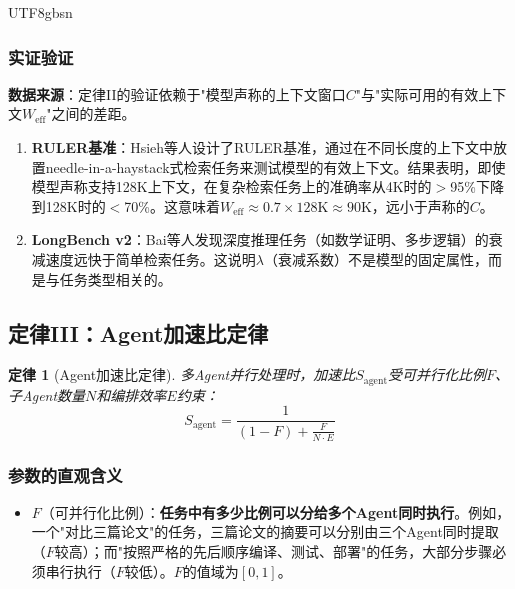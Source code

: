 \documentclass[11pt,a4paper]{article}
\newtheorem{law}{定律}[section]
\begin{document}
\begin{CJK*}{UTF8}{gbsn}
\subsubsection{实证验证}

\textbf{数据来源}：定律II的验证依赖于"模型声称的上下文窗口$C$"与"实际可用的有效上下文$W_{\mathrm{eff}}$"之间的差距。

\begin{enumerate}[nosep]
\item \textbf{RULER基准}：Hsieh等人设计了RULER基准，通过在不同长度的上下文中放置needle-in-a-haystack式检索任务来测试模型的有效上下文\cite{ruler2024}。结果表明，即使模型声称支持128K上下文，在复杂检索任务上的准确率从4K时的$>$95\%下降到128K时的$<$70\%。这意味着$W_{\mathrm{eff}} \approx 0.7 \times 128\mathrm{K} \approx 90\mathrm{K}$，远小于声称的$C$。

\item \textbf{LongBench v2}：Bai等人发现深度推理任务（如数学证明、多步逻辑）的衰减速度远快于简单检索任务\cite{longbenchv2_2024}。这说明$\lambda$（衰减系数）不是模型的固定属性，而是与任务类型相关的。
\end{enumerate}

\subsection{定律III：Agent加速比定律}
\label{sec:law3}

\begin{law}[Agent加速比定律]
多Agent并行处理时，加速比$S_{\mathrm{agent}}$受可并行化比例$F$、子Agent数量$N$和编排效率$E$约束：
\begin{equation}
\label{eq:agent}
S_{\mathrm{agent}} = \frac{1}{(1-F) + \frac{F}{N \cdot E}}
\end{equation}
\end{law}

\subsubsection{参数的直观含义}

\begin{itemize}[nosep]
\item $F$（可并行化比例）：\textbf{任务中有多少比例可以分给多个Agent同时执行}。例如，一个"对比三篇论文"的任务，三篇论文的摘要可以分别由三个Agent同时提取（$F$较高）；而"按照严格的先后顺序编译、测试、部署"的任务，大部分步骤必须串行执行（$F$较低）。$F$的值域为$[0, 1]$。


\end{itemize}
\end{CJK*}
\end{document}
